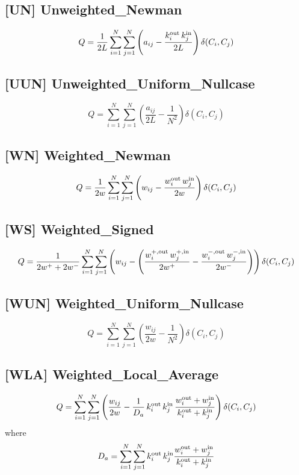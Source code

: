 \documentclass[11pt]{article}
\newcommand{\beq}{\begin{equation}}
\newcommand{\eeq}{\end{equation}}
\newcommand{\sz}{\scriptsize}
\newcommand{\wout}[2]{{#1}_{#2}^{\mbox{\sz out}}}
\newcommand{\win}[2]{{#1}_{#2}^{\mbox{\sz in}}}
\newcommand{\wpos}[2]{{#1}_{#2}^{+}}
\newcommand{\wneg}[2]{{#1}_{#2}^{-}}
\newcommand{\wposout}[2]{{#1}_{#2}^{+,\mbox{\sz out}}}
\newcommand{\wposin}[2]{{#1}_{#2}^{+,\mbox{\sz in}}}
\newcommand{\wnegout}[2]{{#1}_{#2}^{-,\mbox{\sz out}}}
\newcommand{\wnegin}[2]{{#1}_{#2}^{-,\mbox{\sz in}}}
\begin{document}
\subsection{[UN] Unweighted\_Newman}

\beq
  Q = \frac{1}{2L} \sum_{i=1}^N \sum_{j=1}^N \left(
        a_{ij} - \frac{\wout{k}{i}\,\win{k}{j}}{2L}
      \right)\delta(C_i,C_j)
\eeq


\subsection{[UUN] Unweighted\_Uniform\_Nullcase}

\beq
  Q = \sum_{i=1}^N \sum_{j=1}^N \left(
        \frac{a_{ij}}{2L} - \frac{1}{N^2}
      \right)\delta(C_i,C_j)
\eeq


\subsection{[WN] Weighted\_Newman}

\beq
  Q = \frac{1}{2w} \sum_{i=1}^N \sum_{j=1}^N \left(
        w_{ij} - \frac{\wout{w}{i}\,\win{w}{j}}{2w}
      \right)\delta(C_i,C_j)
\eeq


\subsection{[WS] Weighted\_Signed}

\beq
  Q = \frac{1}{2\wpos{w}{} + 2\wneg{w}{}} \sum_{i=1}^N \sum_{j=1}^N \left(
        w_{ij} - \left(
        \frac{\wposout{w}{i}\,\wposin{w}{j}}{2\wpos{w}{}} - \frac{\wnegout{w}{i}\,\wnegin{w}{j}}{2\wneg{w}{}}
        \right)
      \right)\delta(C_i,C_j)
\eeq


\subsection{[WUN] Weighted\_Uniform\_Nullcase}

\beq
  Q = \sum_{i=1}^N \sum_{j=1}^N \left(
        \frac{w_{ij}}{2w} - \frac{1}{N^2}
      \right)\delta(C_i,C_j)
\eeq


\subsection{[WLA] Weighted\_Local\_Average}

\beq
  Q = \sum_{i=1}^N \sum_{j=1}^N \left(
       \frac{w_{ij}}{2w}
       - \frac{1}{D_a}\,\wout{k}{i}\,\win{k}{j}\,\frac{\wout{w}{i}+\win{w}{j}}{\wout{k}{i}+\win{k}{j}}
      \right)\delta(C_i,C_j)
\eeq
where
\beq
  D_a = \sum_{i=1}^N \sum_{j=1}^N \wout{k}{i}\,\win{k}{j} \frac{\wout{w}{i}+\win{w}{j}}{\wout{k}{i}+\win{k}{j}}
\eeq
\end{document}
